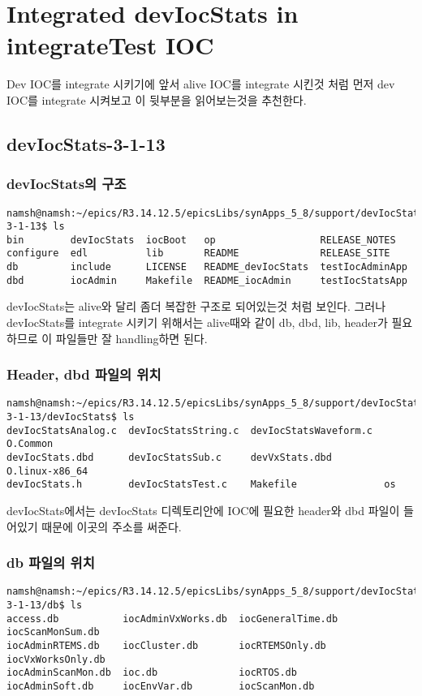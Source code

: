 \documentclass[11pt
  , a4paper
  , article
  , oneside
]{memoir}
\begin{document}
\chapter{Integrated devIocStats in integrateTest IOC}
Dev IOC를 integrate 시키기에 앞서 alive IOC를 integrate 시킨것 처럼 먼저 dev IOC를 integrate 시켜보고 이 뒷부분을 읽어보는것을 추천한다.
\section{devIocStats-3-1-13}
\subsection{devIocStats의 구조}
\begin{lstlisting}[style=termstyle]
namsh@namsh:~/epics/R3.14.12.5/epicsLibs/synApps_5_8/support/devIocStats-3-1-13$ ls
bin        devIocStats  iocBoot   op                  RELEASE_NOTES
configure  edl          lib       README              RELEASE_SITE
db         include      LICENSE   README_devIocStats  testIocAdminApp
dbd        iocAdmin     Makefile  README_iocAdmin     testIocStatsApp
\end{lstlisting}
devIocStats는 alive와 달리 좀더 복잡한 구조로 되어있는것 처럼 보인다. 그러나 devIocStats를 integrate 시키기 위해서는 alive때와 같이 db, dbd, lib, header가 필요하므로 이 파일들만 잘 handling하면 된다.
\subsection{Header, dbd 파일의 위치}
\begin{lstlisting}[style=termstyle]
namsh@namsh:~/epics/R3.14.12.5/epicsLibs/synApps_5_8/support/devIocStats-3-1-13/devIocStats$ ls
devIocStatsAnalog.c  devIocStatsString.c  devIocStatsWaveform.c  O.Common
devIocStats.dbd      devIocStatsSub.c     devVxStats.dbd         O.linux-x86_64
devIocStats.h        devIocStatsTest.c    Makefile               os
\end{lstlisting}
devIocStats에서는 devIocStats 디렉토리안에 IOC에 필요한 header와 dbd 파일이 들어있기 때문에 이곳의 주소를 써준다.
\subsection{db 파일의 위치}
\begin{lstlisting}[style=termstyle]
namsh@namsh:~/epics/R3.14.12.5/epicsLibs/synApps_5_8/support/devIocStats-3-1-13/db$ ls
access.db           iocAdminVxWorks.db  iocGeneralTime.db  iocScanMonSum.db
iocAdminRTEMS.db    iocCluster.db       iocRTEMSOnly.db    iocVxWorksOnly.db
iocAdminScanMon.db  ioc.db              iocRTOS.db
iocAdminSoft.db     iocEnvVar.db        iocScanMon.db
\end{lstlisting}
\end{document}
